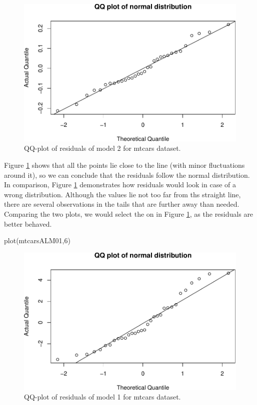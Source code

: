 \documentclass[
]{book}
\newenvironment{Shaded}{\begin{snugshade}}{\end{snugshade}}
\newcommand{\DecValTok}[1]{\textcolor[rgb]{0.00,0.00,0.81}{#1}}
\newcommand{\FunctionTok}[1]{\textcolor[rgb]{0.00,0.00,0.00}{#1}}
\newcommand{\NormalTok}[1]{#1}
\theoremstyle{definition}
\theoremstyle{definition}
\theoremstyle{definition}
\theoremstyle{definition}
\theoremstyle{remark}
\begin{document}
\begin{figure}
\centering
\includegraphics{Svetunkov---Statistics-for-Business-Analytics_files/figure-latex/diagnostics12-1.pdf}
\caption{\label{fig:diagnostics12}QQ-plot of residuals of model 2 for mtcars dataset.}
\end{figure}

Figure \ref{fig:diagnostics12} shows that all the points lie close to the line (with minor fluctuations around it), so we can conclude that the residuals follow the normal distribution. In comparison, Figure \ref{fig:diagnostics12} demonstrates how residuals would look in case of a wrong distribution. Although the values lie not too far from ths straight line, there are several observations in the tails that are further away than needed. Comparing the two plots, we would select the on in Figure \ref{fig:diagnostics12}, as the residuals are better behaved.

\begin{Shaded}
\begin{Highlighting}[]
\FunctionTok{plot}\NormalTok{(mtcarsALM01,}\DecValTok{6}\NormalTok{)}
\end{Highlighting}
\end{Shaded}

\begin{figure}
\centering
\includegraphics{Svetunkov---Statistics-for-Business-Analytics_files/figure-latex/diagnostics13-1.pdf}
\caption{\label{fig:diagnostics13}QQ-plot of residuals of model 1 for mtcars dataset.}
\end{figure}
\end{document}
